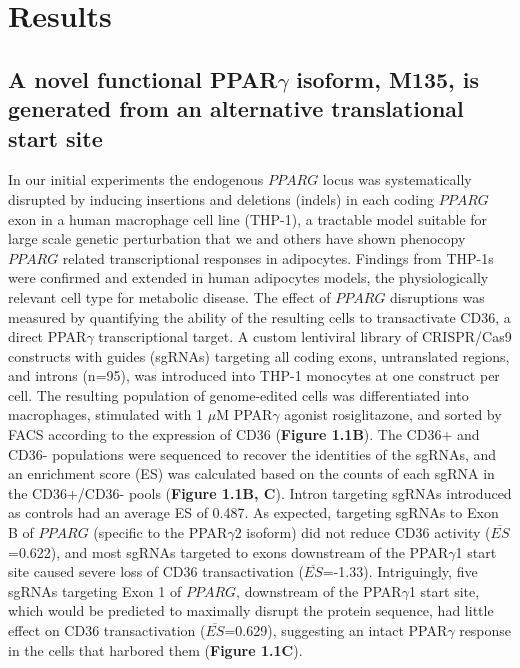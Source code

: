 \section{Results}

\subsection{A novel functional PPAR\texorpdfstring{$\gamma$}{gamma} isoform, M135, is generated from an alternative translational start site}

In our initial experiments the endogenous \(PPARG\) locus was systematically disrupted by inducing insertions and deletions (indels) in each coding \(PPARG\) exon in a human macrophage cell line (THP-1), a tractable model suitable for large scale genetic perturbation that we and others have shown phenocopy \(PPARG\) related transcriptional responses in adipocytes\cite{Majithia2016-bm,Agostini2018-bx}. Findings from THP-1s were confirmed and extended in human adipocytes models, the physiologically relevant cell type for metabolic disease. The effect of \(PPARG\) disruptions was measured by quantifying the ability of the resulting cells to transactivate CD36, a direct PPAR$\gamma$ transcriptional target\cite{Tontonoz1998-aq}. A custom lentiviral library of CRISPR/Cas9 constructs with guides (sgRNAs) targeting all coding exons, untranslated regions, and introns (n=95), was introduced into THP-1 monocytes at one construct per cell. The resulting population of genome-edited cells was differentiated into macrophages, stimulated with 1 $\mu$M PPAR$\gamma$ agonist rosiglitazone, and sorted by FACS according to the expression of CD36 (\textbf{Figure 1.1B}). The CD36+ and CD36- populations were sequenced to recover the identities of the sgRNAs, and an enrichment score (ES) was calculated based on the counts of each sgRNA in the CD36+/CD36- pools (\textbf{Figure 1.1B, C}). Intron targeting sgRNAs introduced as controls had an average ES of 0.487. As expected, targeting sgRNAs to Exon B of \(PPARG\) (specific to the PPAR$\gamma$2 isoform) did not reduce CD36 activity ($\overline{ES}$=0.622), and most sgRNAs targeted to exons downstream of the PPAR$\gamma$1 start site caused severe loss of CD36 transactivation ($\overline{ES}$=-1.33). Intriguingly, five sgRNAs targeting Exon 1 of \(PPARG\), downstream of the PPAR$\gamma$1 start site, which would be predicted to maximally disrupt the protein sequence, had little effect on CD36 transactivation ($\overline{ES}$=0.629), suggesting an intact PPAR$\gamma$ response in the cells that harbored them (\textbf{Figure 1.1C}).  

